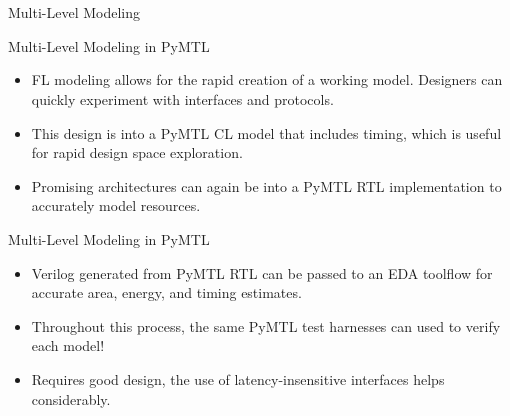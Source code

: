 
\section[{\it Presentation} ML Modeling]{}

\begin{frame}{Multi-Level Modeling}
\end{frame}

\begin{frame}{Multi-Level Modeling in PyMTL}
\begin{itemize}
  \item FL modeling allows for the rapid creation of a working model.
        Designers can quickly experiment with interfaces and protocols.
  \item This design is  into a PyMTL CL model that
        includes timing, which is useful for rapid design space exploration.
  \item Promising architectures can again be  into a
        PyMTL RTL implementation to accurately model resources.
\vspace{0.1in}
\end{itemize}
\end{frame}

\begin{frame}{Multi-Level Modeling in PyMTL}
\begin{itemize}
  \item Verilog generated from PyMTL RTL can be passed to an
        EDA toolflow for accurate area, energy, and timing estimates.
  \item Throughout this process, the same PyMTL test harnesses can used to
        verify each model!
  \item Requires good design, the use of latency-insensitive interfaces
        helps considerably.
\vspace{0.1in}
\end{itemize}
\end{frame}

